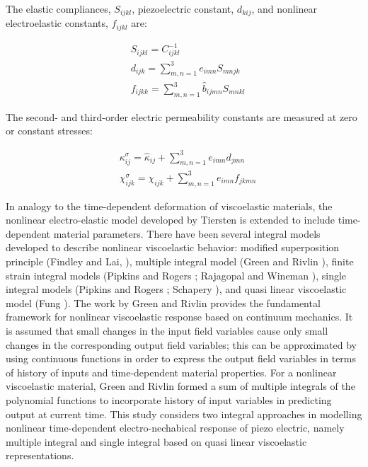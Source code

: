 The elastic compliances, $S_{ijkl}$, piezoelectric constant, $d_{kij}$, and nonlinear electroelastic constants, ${f}_{ijkl}$ are:

\begin{equation}
\begin{aligned}
& S_{ijkl} =  C^{-1}_{ijkl} \\
& d_{ijk} = \sum_{m,n=1}^3 e_{imn} S_{mnjk} \\
& f_{ijkk} =\sum_{m,n=1}^3 \hat{b}_{ijmn} S_{mnkl}
\end{aligned}
\label{EQN:Non_relation_with_constants_1}  
\end{equation}

The second- and third-order electric permeability constants are measured at zero or constant stresses:

\begin{equation}
\begin{aligned}
& {\kappa^{\sigma}_{ij}}= {\hat{\kappa}_{ij}}+\sum_{m,n=1}^3  e_{imn} d_{jmn} \\
& \chi^{\sigma}_{ijk} =    \chi_{ijk}+ \sum_{m,n=1}^3 e_{imn} f_{jkmn}
\end{aligned}
\label{EQN:Non_relation_with_constants_2} 
\end{equation}
 
In analogy to the time-dependent deformation of viscoelastic materials, the nonlinear electro-elastic model developed by Tiersten \cite{tiersten1993electroelastic} is extended to include time-dependent material parameters. 
There have been several integral models developed to describe nonlinear viscoelastic behavior:
 modified superposition principle (Findley and Lai, \cite{Findley1976}),
  multiple integral model (Green and Rivlin \cite{green1959mechanics}),
   finite strain integral models (Pipkins and Rogers \cite{pipkin1968non};
    Rajagopal and Wineman \cite{Wineman2000}),
     single integral models (Pipkins and Rogers \cite{pipkin1968non}; Schapery \cite{schapery1969characterization}),
      and quasi linear viscoelastic model (Fung \cite{fung1981biomechanics}). 
The work by Green and Rivlin \cite{green1959mechanics} provides the fundamental framework for nonlinear viscoelastic response based on continuum mechanics.
 It is assumed that small changes in the input field variables cause only small changes in the corresponding output field variables;
  this can be approximated by using continuous functions in order to express the output field variables in terms of history of inputs and time-dependent material properties. 
For a nonlinear viscoelastic material,
 Green and Rivlin \cite{green1959mechanics} formed a sum of multiple integrals of the polynomial functions to incorporate history of input variables in predicting output at current time.
 This study considers two integral approaches in modelling nonlinear time-dependent electro-nechabical response of piezo electric,
  namely multiple integral and single integral based on quasi linear viscoelastic representations.

